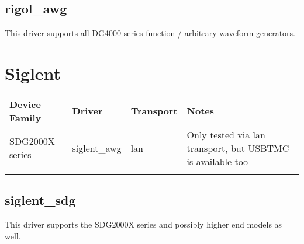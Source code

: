 \subsection{rigol\_awg}

This driver supports all DG4000 series function / arbitrary waveform generators.


\section{Siglent}

\begin{tabularx}{16cm}{lllX}
\thickhline
\textbf{Device Family} & \textbf{Driver} & \textbf{Transport} & \textbf{Notes} \\
\thickhline
SDG2000X series & siglent\_awg & lan & Only tested via lan transport, but USBTMC is available too\\
\thickhline
\end{tabularx}

\subsection{siglent\_sdg}

This driver supports the SDG2000X series and possibly higher end models as well.
